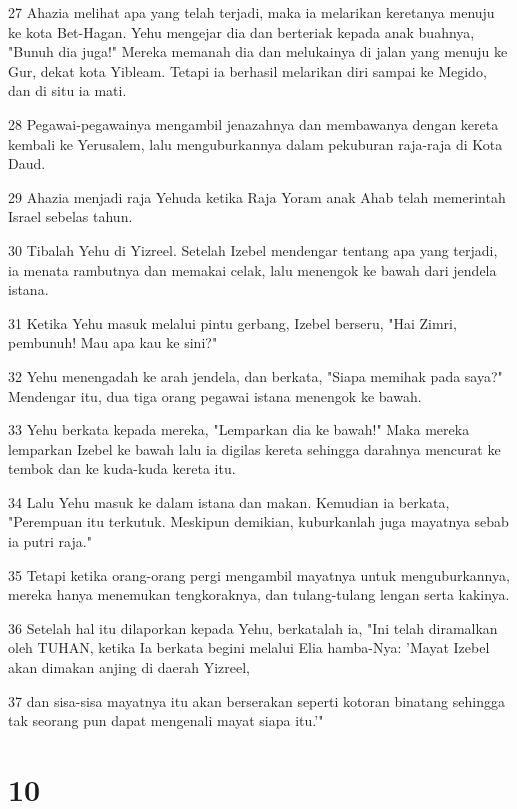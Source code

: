 \par 27 Ahazia melihat apa yang telah terjadi, maka ia melarikan keretanya menuju ke kota Bet-Hagan. Yehu mengejar dia dan berteriak kepada anak buahnya, "Bunuh dia juga!" Mereka memanah dia dan melukainya di jalan yang menuju ke Gur, dekat kota Yibleam. Tetapi ia berhasil melarikan diri sampai ke Megido, dan di situ ia mati.
\par 28 Pegawai-pegawainya mengambil jenazahnya dan membawanya dengan kereta kembali ke Yerusalem, lalu menguburkannya dalam pekuburan raja-raja di Kota Daud.
\par 29 Ahazia menjadi raja Yehuda ketika Raja Yoram anak Ahab telah memerintah Israel sebelas tahun.
\par 30 Tibalah Yehu di Yizreel. Setelah Izebel mendengar tentang apa yang terjadi, ia menata rambutnya dan memakai celak, lalu menengok ke bawah dari jendela istana.
\par 31 Ketika Yehu masuk melalui pintu gerbang, Izebel berseru, "Hai Zimri, pembunuh! Mau apa kau ke sini?"
\par 32 Yehu menengadah ke arah jendela, dan berkata, "Siapa memihak pada saya?" Mendengar itu, dua tiga orang pegawai istana menengok ke bawah.
\par 33 Yehu berkata kepada mereka, "Lemparkan dia ke bawah!" Maka mereka lemparkan Izebel ke bawah lalu ia digilas kereta sehingga darahnya mencurat ke tembok dan ke kuda-kuda kereta itu.
\par 34 Lalu Yehu masuk ke dalam istana dan makan. Kemudian ia berkata, "Perempuan itu terkutuk. Meskipun demikian, kuburkanlah juga mayatnya sebab ia putri raja."
\par 35 Tetapi ketika orang-orang pergi mengambil mayatnya untuk menguburkannya, mereka hanya menemukan tengkoraknya, dan tulang-tulang lengan serta kakinya.
\par 36 Setelah hal itu dilaporkan kepada Yehu, berkatalah ia, "Ini telah diramalkan oleh TUHAN, ketika Ia berkata begini melalui Elia hamba-Nya: 'Mayat Izebel akan dimakan anjing di daerah Yizreel,
\par 37 dan sisa-sisa mayatnya itu akan berserakan seperti kotoran binatang sehingga tak seorang pun dapat mengenali mayat siapa itu.'"

\chapter{10}

